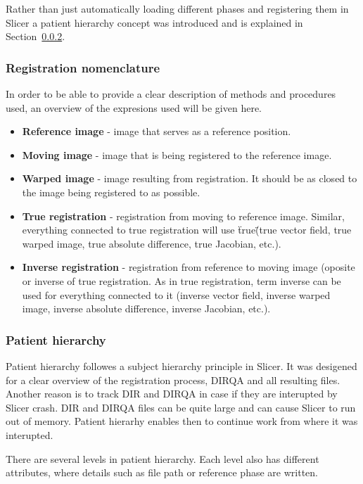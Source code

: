 \documentclass[type=dr, dr=rernat, accentcolor=tud7b,colorbacktitle, bigchapter, openright, twoside, 12pt ]{tudthesis}
\begin{document}
Rather than just automatically loading different phases and registering them in Slicer a patient hierarchy concept was introduced and is explained in Section~\ref{PatHierarchy}.

\subsubsection{Registration nomenclature}

In order to be able to provide a clear description of methods and procedures used, an overview of the expresions used will be given here.

\begin{itemize}
 \item \textbf{Reference image} - image that serves as a reference position.
 \item \textbf{Moving image} - image that is being registered to the reference image.
 \item \textbf{Warped image} - image resulting from registration. It should be as closed to the image being registered to as possible.
 \item \textbf{True registration} - registration from moving to reference image. Similar, everything connected to true registration will use \"true\" (true vector field, true warped image, true absolute difference, true Jacobian, etc.).
 \item \textbf{Inverse registration} - registration from reference to moving image (oposite or inverse of true registration. As in true registration, term inverse can be used for everything connected to it (inverse vector field, inverse warped image, inverse absolute difference, inverse Jacobian, etc.).
\end{itemize}


\subsubsection{Patient hierarchy} 
\label{PatHierarchy}

Patient hierarchy followes a subject hierarchy principle in Slicer. It was desigened for a clear overview of the registration process, DIRQA and all resulting files. Another reason is to track DIR
and DIRQA in case if they are interupted by Slicer crash. DIR and DIRQA files can be quite large and can cause Slicer to run out of memory. Patient hierarhy enables then to continue work
from where it was interupted.

There are several levels in patient hierarchy. Each level also has different attributes, where details such as file path or reference phase are written.
\end{document}
